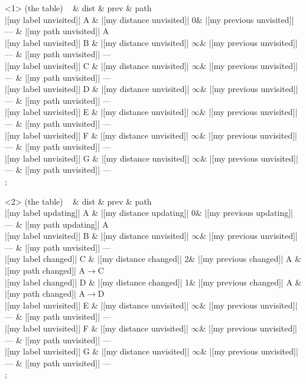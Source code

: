 \begin{onlyenv}<1>
 (the table) {
~ \& dist \& prev \& path \\
|[my label unvisited]| A \& |[my distance unvisited]| 0\& |[my previous unvisited]| --- \& |[my path unvisited]| A\\
|[my label unvisited]| B \& |[my distance unvisited]| $\infty$\& |[my previous unvisited]| --- \& |[my path unvisited]| ---\\
|[my label unvisited]| C \& |[my distance unvisited]| $\infty$\& |[my previous unvisited]| --- \& |[my path unvisited]| ---\\
|[my label unvisited]| D \& |[my distance unvisited]| $\infty$\& |[my previous unvisited]| --- \& |[my path unvisited]| ---\\
|[my label unvisited]| E \& |[my distance unvisited]| $\infty$\& |[my previous unvisited]| --- \& |[my path unvisited]| ---\\
|[my label unvisited]| F \& |[my distance unvisited]| $\infty$\& |[my previous unvisited]| --- \& |[my path unvisited]| ---\\
|[my label unvisited]| G \& |[my distance unvisited]| $\infty$\& |[my previous unvisited]| --- \& |[my path unvisited]| ---\\
};
\end{onlyenv}
            
\begin{onlyenv}<2>
 (the table) {
~ \& dist \& prev \& path \\
|[my label updating]| A \& |[my distance updating]| 0\& |[my previous updating]| --- \& |[my path updating]| A\\
|[my label unvisited]| B \& |[my distance unvisited]| $\infty$\& |[my previous unvisited]| --- \& |[my path unvisited]| ---\\
|[my label changed]| C \& |[my distance changed]| 2\& |[my previous changed]| A \& |[my path changed]| A$\rightarrow$C\\
|[my label changed]| D \& |[my distance changed]| 1\& |[my previous changed]| A \& |[my path changed]| A$\rightarrow$D\\
|[my label unvisited]| E \& |[my distance unvisited]| $\infty$\& |[my previous unvisited]| --- \& |[my path unvisited]| ---\\
|[my label unvisited]| F \& |[my distance unvisited]| $\infty$\& |[my previous unvisited]| --- \& |[my path unvisited]| ---\\
|[my label unvisited]| G \& |[my distance unvisited]| $\infty$\& |[my previous unvisited]| --- \& |[my path unvisited]| ---\\
};
\end{onlyenv}
            
